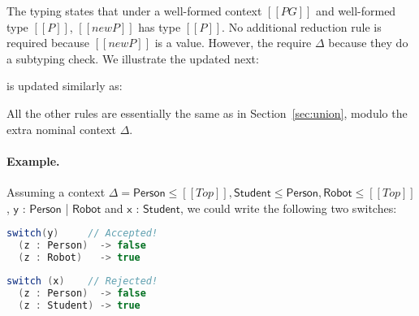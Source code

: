 \begin{center}
\end{center}

The typing  states that under a well-formed
context $[[PG]]$ and well-formed type $[[P]]$,
$[[new P]]$ has type $[[P]]$.
No additional reduction rule is required
because $[[new P]]$ is a value. However, the 
require $\Delta$ because they do a subtyping check. We illustrate
the updated  next:

\begin{center}
\end{center}

\noindent {} is updated similarly as: 

\begin{center}
\end{center}

\noindent All the other rules
are essentially the same as in Section~\ref{sec:union}, modulo
the extra nominal context $\Delta$.

\paragraph{Example.}
Assuming a context $\Delta = \mathsf{Person} \leq [[Top]],
\mathsf{Student} \leq \mathsf{Person}, \mathsf{Robot} \leq [[Top]]$,
$\mathsf{y}$ : $\mathsf{Person}$ | $\mathsf{Robot}$ and $\mathsf{x}$ : $\mathsf{Student}$,
we could write the following two switches:

\vspace{1mm}


\noindent\begin{minipage}{.45\textwidth}
\begin{lstlisting}[language=Scala,frame=tlrb]
switch(y)     // Accepted!
  (z : Person)  -> false
  (z : Robot)   -> true
\end{lstlisting}
\end{minipage}\hfill
\begin{minipage}{.45\textwidth}
\begin{lstlisting}[language=Scala,frame=tlrb]
switch (x)    // Rejected!
  (z : Person)  -> false
  (z : Student) -> true
\end{lstlisting}
\end{minipage}

